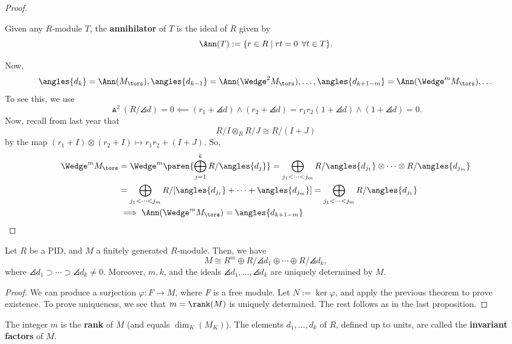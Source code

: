\begin{proof}
    \begin{defn}
        Given any $R$-module $T$, the \textbf{annihilator} of $T$ is the ideal of $R$ given by
        $$\Ann (T) := \{ r \in R \mid rt = 0\:\: \forall t \in T \}.$$
    \end{defn}
    Now,
    $$\angles {d_k} = \Ann (M_{\tors} ), \angles{d_{k-1}}= \Ann ( \Wedge ^2 M_{\tors}),\dots,\angles {d_{k+1-m}}= \Ann ( \Wedge^mM_{\tors}),\dots$$
    To see this, we use
    $$\Wedge^2(R/\angles d) = 0 \impliedby (r_1 + \angles d) \land (r_2 + \angles d) = r_1r_2(1+\angles d) \land (1+ \angles d)=0.$$
    Now, recall from last year that
    $$R/I \otimes _R R/J \cong R/(I+J)$$
    by the map $(r_1+I) \otimes (r_2 + I) \mapsto r_1r_2 + (I+J)$. So,
    \begin{align*}
    \Wedge^m M_{\tors} &= \Wedge^m \paren{ \bigoplus_{j=1}^k R/\angles {d_j}}=\bigoplus_{j_1<\cdots < j_m}R/\angles{d_{j_1}}\otimes \cdots \otimes R/\angles {d_{j_m}}
    \\ &= \bigoplus _{j_1< \cdots < j_m}R/[\angles {d_{j_1}}+ \cdots + \angles {d_{j_m}}] = \bigoplus_{j_1<\cdots < j_m}R/\angles {d_{j_1}}
    \\ & \implies \Ann ( \Wedge^m M_{\tors} ) = \angles {d_{k+1-m}}
    \end{align*}
\end{proof}

\begin{thm}
    Let $R$ be a PID, and $M$ a finitely generated $R$-module. Then, we have
    $$M \cong R^m \oplus R/\angles {d_1}\oplus \cdots \oplus R/\angles {d_k},$$
    where $\angles {d_1}\supset \cdots \supset \angles {d_k} \neq 0$. Moreover, $m,k$, and the ideals $\angles {d_1},\dots, \angles{d_k}$ are uniquely determined by $M$.
\end{thm}

\begin{proof}
    We can produce a surjection $\varphi: F \to M$, where $F$ is a free module. Let $N := \ker \varphi$, and apply the previous theorem to prove existence. To prove uniqueness, we see that $m = \rank (M)$ is uniquely determined. The rest follows as in the last proposition.
\end{proof}

\begin{defn}
    The integer $m$ is the \textbf{rank} of $M$ (and equals $\dim _K(M_K)$). The elements $d_1,\dots,d_k$ of $R$, defined up to units, are called the \textbf{invariant factors} of $M$.
\end{defn}

